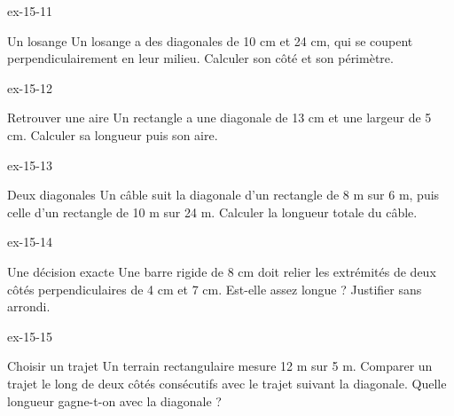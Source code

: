 \begin{blocLivre}{ex-15-11}\begin{exercice}[3]{Un losange}
Un losange a des diagonales de 10 cm et 24 cm, qui se coupent perpendiculairement en leur milieu. Calculer son côté et son périmètre.
\label{fig-ex-15-11}
\end{exercice}\end{blocLivre}
\begin{blocLivre}{ex-15-12}\begin{exercice}[3]{Retrouver une aire}
Un rectangle a une diagonale de 13 cm et une largeur de 5 cm. Calculer sa longueur puis son aire.
\label{fig-ex-15-12}
\end{exercice}\end{blocLivre}
\begin{blocLivre}{ex-15-13}\begin{exercice}[3]{Deux diagonales}
Un câble suit la diagonale d’un rectangle de 8 m sur 6 m, puis celle d’un rectangle de 10 m sur 24 m. Calculer la longueur totale du câble.
\label{fig-ex-15-13}
\end{exercice}\end{blocLivre}
\begin{blocLivre}{ex-15-14}\begin{exercice}[3]{Une décision exacte}
Une barre rigide de 8 cm doit relier les extrémités de deux côtés perpendiculaires de 4 cm et 7 cm. Est-elle assez longue ? Justifier sans arrondi.
\label{fig-ex-15-14}
\end{exercice}\end{blocLivre}
\begin{blocLivre}{ex-15-15}\begin{exercice}[3]{Choisir un trajet}
Un terrain rectangulaire mesure 12 m sur 5 m. Comparer un trajet le long de deux côtés consécutifs avec le trajet suivant la diagonale. Quelle longueur gagne-t-on avec la diagonale ?
\label{fig-ex-15-15}
\end{exercice}\end{blocLivre}

\clearpage
